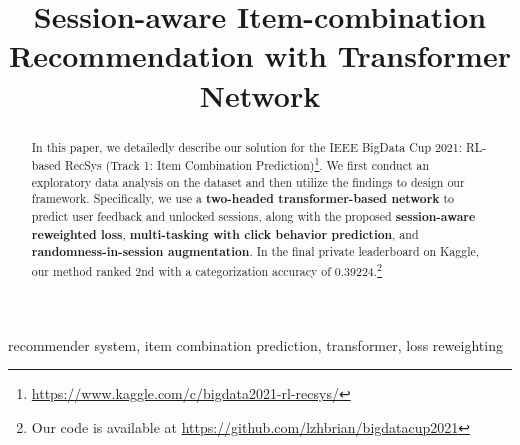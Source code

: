 \documentclass[conference]{IEEEtran}
\begin{document}
\title{Session-aware Item-combination Recommendation with Transformer Network}

\author{
\and
{}
}





\maketitle

\begin{abstract}
    In this paper, we detailedly describe our solution for the IEEE BigData Cup 2021: RL-based RecSys (Track 1: Item Combination Prediction)\footnote{\href{https://www.kaggle.com/c/bigdata2021-rl-recsys/}{https://www.kaggle.com/c/bigdata2021-rl-recsys/}}.
    We first conduct an exploratory data analysis on the dataset and then utilize the findings to design our framework.
    Specifically, we use a \textbf{two-headed transformer-based network} to predict user feedback and unlocked sessions, along with the proposed \textbf{session-aware reweighted loss}, \textbf{multi-tasking with click behavior prediction}, and \textbf{randomness-in-session augmentation}.
    In the final private leaderboard on Kaggle, our method ranked 2nd with a categorization accuracy of 0.39224.\footnote{Our code is available at \href{https://github.com/lzhbrian/bigdatacup2021}{https://github.com/lzhbrian/bigdatacup2021}}
\end{abstract}

\begin{IEEEkeywords}
recommender system, item combination prediction, transformer, loss reweighting
\end{IEEEkeywords}











% 




\balance


\end{document}
